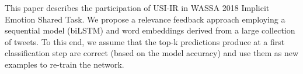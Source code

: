 This paper describes the participation of USI-IR in WASSA 2018 Implicit Emotion Shared Task. We propose a relevance feedback approach employing a sequential model (biLSTM) and word embeddings derived from a large collection of tweets. To this end, we assume that the top-k predictions produce at a first classification step are correct (based on the model accuracy) and use them as new examples to re-train the network.
